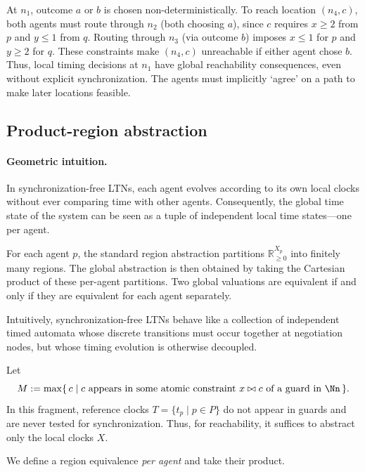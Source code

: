 At $n_1$, outcome $a$ or $b$ is chosen non-deterministically. To reach location $(n_4, c)$, both agents must route through $n_2$ (both choosing $a$), since $c$ requires $x \geq 2$ from $p$ and $y \leq 1$ from $q$. Routing through $n_3$ (via outcome $b$) imposes $x \leq 1$ for $p$ and $y \geq 2$ for $q$. These constraints make $(n_4, c)$ unreachable if either agent chose $b$. Thus, local timing decisions at $n_1$ have global reachability consequences, even without explicit synchronization. The agents must implicitly `agree' on a path to make later locations feasible.

\subsection{Product-region abstraction}
\paragraph{Geometric intuition.}
In synchronization-free LTNs, each agent evolves according to its own
local clocks without ever comparing time with other agents.
Consequently, the global time state of the system can be seen as a tuple
of independent local time states—one per agent.

For each agent $p$, the standard region abstraction partitions
$\mathbb{R}_{\ge 0}^{X_p}$ into finitely many regions.
The global abstraction is then obtained by taking the Cartesian product
of these per-agent partitions.
Two global valuations are equivalent if and only if they are equivalent
for each agent separately.

Intuitively, synchronization-free LTNs behave like a collection of
independent timed automata whose discrete transitions must occur
together at negotiation nodes, but whose timing evolution is otherwise
decoupled.

Let
\[
  M := \max\{\,c \mid \text{$c$ appears in some atomic constraint $x\bowtie c$ of a guard in $\Nn$}\,\}.
\]
In this fragment, reference clocks $T=\{t_p\mid p\in P\}$ do not appear in guards
and are never tested for synchronization. Thus, for reachability, it suffices to
abstract only the local clocks $X$.

We define a region equivalence \emph{per agent} and take their product.

